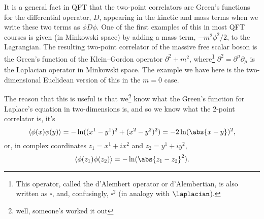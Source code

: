 \documentclass[fleqn]{NotesClass}
\DeclarePairedDelimiter{\correlator}{\langle}{\rangle}
\newcommand{\dalembertian}{\partial^2}
\begin{document}
    \begin{remark}{}{}
        It is a general fact in QFT that the two-point correlators are Green's functions for the differential operator, \(D\), appearing in the kinetic and mass terms when we write these two terms as \(\phi D \phi\).
        One of the first examples of this in most QFT courses is given (in Minkowski space) by adding a mass term, \(-m^2\phi^2/2\), to the Lagrangian.
        The resulting two-point correlator of the massive free scalar boson is the Green's function of the Klein--Gordon operator \(\dalembertian + m^2\), where\footnote{This operator, called the d'Alembert operator or d'Alembertian, is also written as \(\square\), and, confusingly, \(\square^2\) (in analogy with \(\laplacian\)).} \(\dalembertian = \partial^\mu \partial_\mu\) is the Laplacian operator in Minkowski space.
        The example we have here is the two-dimensional Euclidean version of this in the \(m = 0\) case.
    \end{remark}
    
    The reason that this is useful is that we\footnote{well, someone's worked it out} know what the Green's function for Laplace's equation in two-dimensions is, and so we know what the 2-point correlator is, it's
    \begin{equation}
        \correlator{\phi(x)\phi(y)} = -\ln((x^1 - y^1)^2 + (x^2 - y^2)^2) = -2\ln(\abs{x - y})^2,
    \end{equation}
    or, in complex coordinates \(z_1 = x^1 + ix^2\) and \(z_2 = y^1 + iy^2\),
    \begin{equation}
        \label{eqn:free boson 2-point correlator}
        \correlator{\phi(z_1)\phi(z_2)} = -\ln(\abs{z_1 - z_2}^2).
    \end{equation}
    
\end{document}
